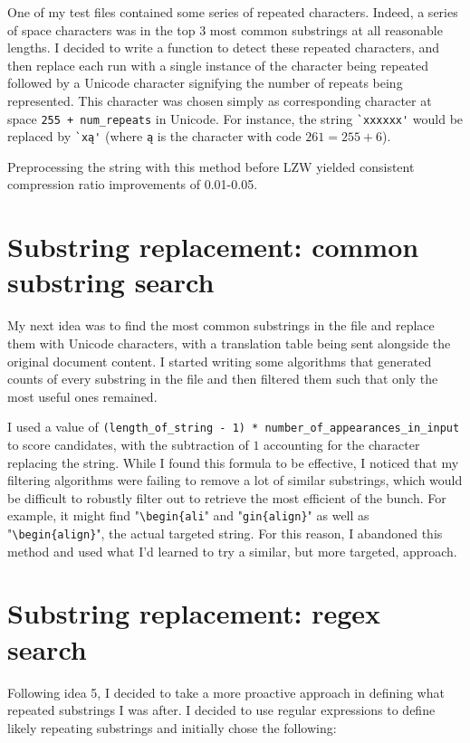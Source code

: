 \documentclass[11pt]{article} %
\begin{document}
One of my test files contained some series of repeated characters. Indeed, a series of space characters was in the top 3 most common substrings at all reasonable lengths. I decided to write a function to detect these repeated characters, and then replace each run with a single instance of the character being repeated followed by a Unicode character signifying the number of repeats being represented. This character was chosen simply as corresponding character at space \verb|255 + num_repeats| in Unicode. For instance, the string \verb|`xxxxxx'| would be replaced by \verb|`xą'| (where \verb|ą| is the character with code $261 = 255 + 6$).

Preprocessing the string with this method before LZW yielded consistent compression ratio improvements of 0.01-0.05.


\section{Substring replacement: common substring search} \label{commonSubstringSearch}

My next idea was to find the most common substrings in the file and replace them with Unicode characters, with a translation table being sent alongside the original document content. I started writing some algorithms that generated counts of every substring in the file and then filtered them such that only the most useful ones remained.

I used a value of \verb|(length_of_string - 1) * number_of_appearances_in_input| to score candidates, with the subtraction of $1$ accounting for the character replacing the string. While I found this formula to be effective, I noticed that my filtering algorithms were failing to remove a lot of similar substrings, which would be difficult to robustly filter out to retrieve the most efficient of the bunch. For example, it might find "\verb|\begin{ali|" and "\verb|gin{align}|" as well as "\verb|\begin{align}|", the actual targeted string. For this reason, I abandoned this method and used what I'd learned to try a similar, but more targeted, approach.


\section{Substring replacement: regex search}

Following idea 5, I decided to take a more proactive approach in defining what repeated substrings I was after. I decided to use regular expressions to define likely repeating substrings and initially chose the following:
\end{document}
